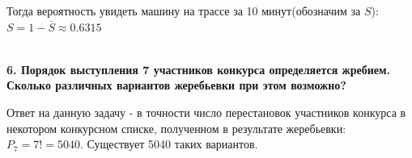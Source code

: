 \documentclass{article}
\begin{document}
Тогда вероятность увидеть машину на трассе за 10 минут(обозначим за $S$): $S = 1 - \overline{S} \approx 0.6315$

\textbf{\\6. Порядок выступления 7 участников конкурса определяется жребием. Сколько различных вариантов жеребьевки при этом возможно?}

Ответ на данную задачу - в точности число перестановок участников конкурса в некотором конкурсном списке, полученном в результате жеребьевки: $P_{7} = 7! = 5040$.
Существует 5040 таких вариантов.
\end{document}
